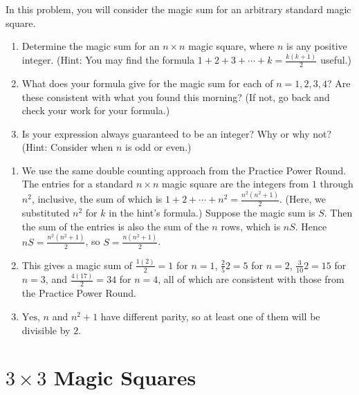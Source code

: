 \documentclass[11pt]{article}
\renewenvironment{problem}{\begin{problems}}{\end{problems}\vspace{5pt}}
\begin{document}
\begin{problem}[5=3+1+1 points]
In this problem, you will consider the magic sum for an arbitrary standard magic square.
\begin{enumerate}[label=(\alph*)]
\item Determine the magic sum for an $n \times n$ magic square, where $n$ is any positive integer.
(Hint: You may find the formula $1 + 2 + 3 + \cdots + k = \frac{k(k+1)}{2}$ useful.)

\item What does your formula give for the magic sum for each of $n = 1, 2, 3, 4$?
Are these consistent with what you found this morning?
(If not, go back and check your work for your formula.)

\item Is your expression always guaranteed to be an integer? Why or why not? (Hint: Consider when $n$ is odd
or even.)
\end{enumerate}
\end{problem}

\begin{solution}
\begin{enumerate}[label=(\alph*)]
\item We use the same double counting approach from the Practice Power Round. The entries for a standard
$n \times n$ magic square are the integers from $1$ through $n^2$, inclusive, the sum of which is
$1 + 2 + \cdots + n^2 = \frac{n^2(n^2+1)}{2}$. (Here, we substituted $n^2$ for $k$ in the hint's formula.)
Suppose the magic sum is $S$. Then the sum of the entries is also the sum of the $n$ rows, which is $nS$.
Hence $nS = \frac{n^2(n^2+1)}{2}$, so $S = \boxed{\frac{n(n^2+1)}{2}}$.

\item This gives a magic sum of $\frac{1(2)}{2} = 1$ for $n = 1$, $\frac{2}{5}{2} = 5$ for $n = 2$,
$\frac{3}{10}{2} = 15$ for $n = 3$, and $\frac{4(17)}{2} = 34$ for $n = 4$, all of which are consistent
with those from the Practice Power Round.

\item $\boxed{\text{Yes}}$, $n$ and $n^2+1$ have different parity, so at least one of them will be divisible by $2$.
\end{enumerate}
\end{solution}


\section{$3 \times 3$ Magic Squares}
\end{document}
